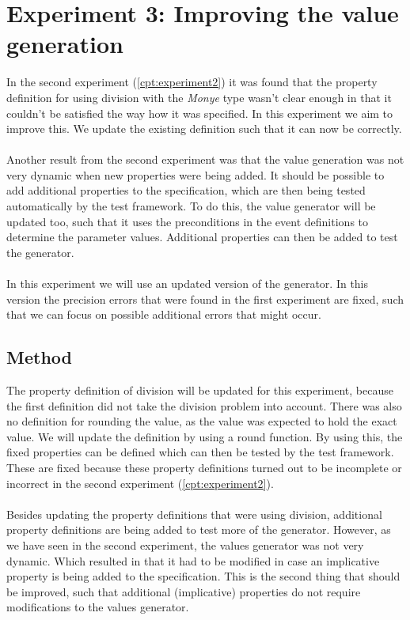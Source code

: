 \chapter{Experiment 3: Improving the value generation}
\label{cpt:experiment3}
In the second experiment (\autoref{cpt:experiment2}) it was found that the
property definition for using division with the \textit{Monye} type wasn't clear
enough in that it couldn't be satisfied the way how it was specified. In this
experiment we aim to improve this. We update the existing definition such that
it can now be correctly.\\
\\
Another result from the second experiment was that the value generation was not
very dynamic when new properties were being added. It should be possible to add
additional properties to the specification, which are then being tested
automatically by the test framework. To do this, the value generator will be
updated too, such that it uses the preconditions in the event definitions to
determine the parameter values. Additional properties can then be added to test
the generator.\\
\\
In this experiment we will use an updated version of the generator. In this
version the precision errors that were found in the first experiment are fixed,
such that we can focus on possible additional errors that might occur.

\section{Method}
The property definition of division will be updated for this experiment, because
the first definition did not take the division problem into account. There was
also no definition for rounding the value, as the value was expected to hold the
exact value. We will update the definition by using a round function. By using
this, the fixed properties can be defined which can then be tested by the test
framework. These are fixed because these property definitions turned out to be
incomplete or incorrect in the second experiment (\autoref{cpt:experiment2}).\\
\\
Besides updating the property definitions that were using division, additional
property definitions are being added to test more of the generator. However, as
we have seen in the second experiment, the values generator was not very
dynamic. Which resulted in that it had to be modified in case an implicative
property is being added to the specification. This is the second thing that
should be improved, such that additional (implicative) properties do not require
modifications to the values generator.

